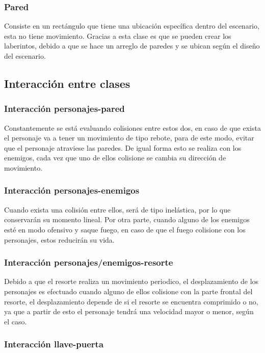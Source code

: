 \documentclass{article}
\begin{document}
\subsubsection{Pared}

Consiste en un rectángulo que tiene una ubicación específica dentro del escenario, esta no tiene movimiento. Gracias a esta clase es que se pueden crear los laberintos, debido a que se hace un arreglo de paredes y se ubican según el diseño del escenario.


\subsection{Interacción entre clases}

\subsubsection{Interacción personajes-pared}

Constantemente se está evaluando colisiones entre estos dos, en caso de que exista el personaje va a tener un movimiento de tipo rebote, para de este modo, evitar que el personaje atraviese las paredes. De igual forma esto se realiza con los enemigos, cada vez que uno de ellos colisione se cambia su dirección de movimiento.

\subsubsection{Interacción personajes-enemigos}

Cuando exista una colisión entre ellos, será de tipo inelástica, por lo que conservarán su momento lineal. Por otra parte, cuando alguno de los enemigos esté en modo ofensivo y saque fuego, en caso de que el fuego colisione con los personajes, estos reducirán su vida.

\subsubsection{Interacción personajes/enemigos-resorte}

Debido a que el resorte realiza un movimiento periodico, el desplazamiento de los personajes es efectuado cuando alguno de ellos colisione con la parte frontal del resorte, el desplazamiento depende de si el resorte se encuentra comprimido o no, ya que a partir de esto el personaje tendrá una velocidad mayor o menor, según el caso.

\subsubsection{Interacción llave-puerta}
\end{document}
